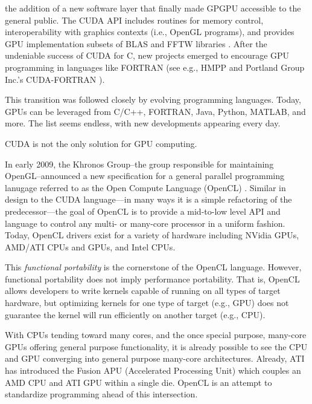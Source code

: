 \documentclass{report}
\begin{document}
the addition of a new software layer that finally made GPGPU accessible to the general public. The CUDA API includes routines for memory control, interoperability with graphics contexts (i.e., 
OpenGL programs), and provides GPU implementation subsets of BLAS and FFTW libraries \cite{CudaGuide2013}. After the undeniable success of CUDA for C, new projects emerged to encourage GPU programming in languages like FORTRAN (see e.g., HMPP \cite{HMPP2009} and Portland Group Inc.'s CUDA-FORTRAN \cite{CudaFortran2009}). 

This transition was 
followed closely by evolving programming languages. Today, GPUs can be leveraged from C/C++, FORTRAN, Java, Python, MATLAB, and more. The list seems endless, with new developments appearing every day. 




CUDA is not the only solution for GPU computing. 


In early 2009, the Khronos Group--the group responsible for maintaining OpenGL--announced a new specification for a general 
parallel programming lanugage referred to as the Open Compute Language (OpenCL) \cite{OpenCL2009}. Similar in design to the CUDA language---in many ways it is a simple refactoring of the predecessor---the goal of OpenCL is to provide a mid-to-low level API and language to control any multi- or many-core processor in a uniform fashion. Today, OpenCL drivers exist for a variety of hardware including NVidia GPUs, AMD/ATI CPUs and GPUs, and Intel CPUs. 

This \textit{functional portability} is the cornerstone of the OpenCL language. However, functional portability does not imply performance portability. That is, OpenCL allows developers to write kernels capable of running on all types of target hardware, but optimizing kernels for one type of target (e.g., GPU) does not guarantee the kernel will run efficiently on another target (e.g., CPU).

With CPUs tending toward many cores, and the once special purpose, many-core GPUs offering general purpose functionality, it is already possible to see the CPU and GPU converging into general purpose many-core architectures. Already, ATI has introduced the Fusion APU (Accelerated Processing Unit) which couples an AMD CPU and ATI GPU within a single die. OpenCL is an attempt to standardize programming ahead of this intersection. 
\end{document}
